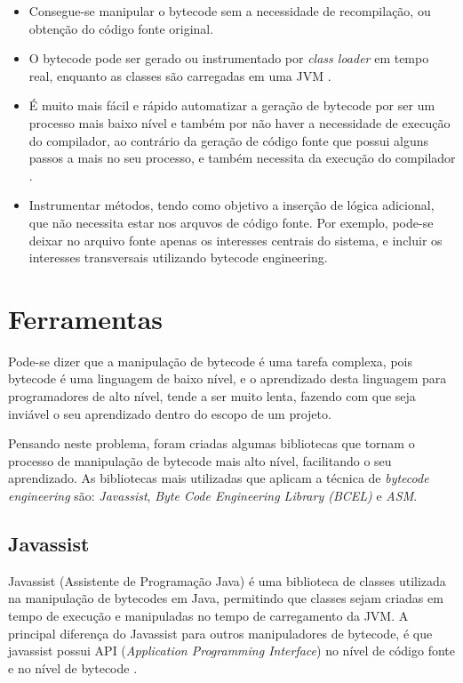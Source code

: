 \documentclass[tc,openright]{iiufrgs}
\begin{document}
\begin{itemize}
\item Consegue-se manipular o bytecode sem a necessidade de recompilação, ou obtenção do código fonte original.
\item O bytecode pode ser gerado ou instrumentado por \textit{class loader} em tempo real, enquanto as classes são carregadas em uma JVM \cite{kalinovsky2004covert}.
\item É muito mais fácil e rápido automatizar a geração de bytecode por ser um processo mais baixo nível e também por não haver a necessidade de execução do compilador, ao contrário da geração de código fonte que possui alguns passos a mais no seu processo, e também necessita da execução do compilador \cite{kalinovsky2004covert}.
\item Instrumentar métodos, tendo como objetivo a inserção de lógica adicional, que não necessita estar nos arquvos de código fonte. Por exemplo, pode-se deixar no arquivo fonte apenas os interesses centrais do sistema, e incluir os interesses transversais utilizando bytecode engineering. 
\end{itemize}

\section{Ferramentas}

Pode-se dizer que a manipulação de bytecode é uma tarefa complexa, pois bytecode é uma linguagem de baixo nível, e o aprendizado desta linguagem para programadores de alto nível, tende a ser muito lenta, fazendo com que seja inviável o seu aprendizado dentro do escopo de um projeto.

Pensando neste problema, foram criadas algumas bibliotecas que tornam o processo de manipulação de bytecode mais alto nível, facilitando o seu aprendizado. As bibliotecas mais utilizadas que aplicam a técnica de \textit{bytecode engineering} são: \textit{Javassist}, \textit{Byte Code Engineering Library (BCEL)} e \textit{ASM}.

\subsection {Javassist}

Javassist (Assistente de Programação Java) é uma biblioteca de classes utilizada na manipulação de bytecodes em Java, permitindo que classes sejam criadas em tempo de execução e manipuladas no tempo de carregamento da JVM. A principal diferença do Javassist para outros manipuladores de bytecode, é que javassist possui  API (\textit{Application Programming Interface}) no nível de código fonte e no nível de bytecode \cite{javassist}.
\end{document}
